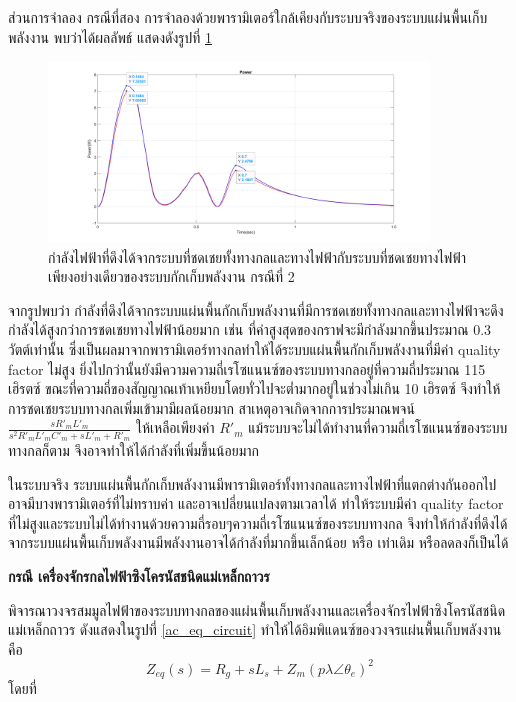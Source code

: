 \documentclass[11pt,a4paper]{article}
\begin{document}
ส่วนการจำลอง กรณีที่สอง การจำลองด้วยพารามิเตอร์ใกล้เคียงกับระบบจริงของระบบแผ่นพื้นเก็บพลังงาน พบว่าได้ผลลัพธ์ แสดงดังรูปที่ \ref{power_dc_case2}
\begin{figure}[H]
    \begin{center}
        \includegraphics[width=0.9\textwidth]{power_dc_case2.jpg}
    \end{center}
    \caption{กำลังไฟฟ้าที่ดึงได้จากระบบที่ชดเชยทั้งทางกลและทางไฟฟ้ากับระบบที่ชดเชยทางไฟฟ้าเพียงอย่างเดียวของระบบกักเก็บพลังงาน กรณีที่ 2}
    \label{power_dc_case2}
\end{figure}
จากรูปพบว่า กำลังที่ดึงได้จากระบบแผ่นพื้นกักเก็บพลังงานที่มีการชดเชยทั้งทางกลและทางไฟฟ้าจะดึงกำลังได้สูงกว่าการชดเชยทางไฟฟ้าน้อยมาก เช่น ที่ค่าสูงสุดของกราฟจะมีกำลังมากขึ้นประมาณ 0.3 วัตต์เท่านั้น 
ซึ่งเป็นผลมาจากพารามิเตอร์ทางกลทำให้ได้ระบบแผ่นพื้นกักเก็บพลังงานที่มีค่า quality factor ไม่สูง ยิ่งไปกว่านั้นยังมีความความถี่เรโซแนนซ์ของระบบทางกลอยู่ที่ความถี่ประมาณ 115 เฮิรตซ์ ขณะที่ความถี่ของสัญญาณเท้าเหยียบโดยทั่วไปจะต่ำมากอยู่ในช่วงไม่เกิน 10 เฮิรตซ์ 
จึงทำให้การชดเชยระบบทางกลเพิ่มเข้ามามีผลน้อยมาก สาเหตุอาจเกิดจากการประมาณพจน์ $\frac{ sR'_{m}L'_{m} }{ s^2R'_{m}L'_{m}C'_{m} + sL'_{m} + R'_{m} }$ ให้เหลือเพียงค่า $R'_{m}$ แม้ระบบจะไม่ได้ทำงานที่ความถี่เรโซแนนซ์ของระบบทางกลก็ตาม จึงอาจทำให้ได้กำลังที่เพิ่มขึ้นน้อยมาก

ในระบบจริง ระบบแผ่นพื้นกักเก็บพลังงานมีพารามิเตอร์ทั้งทางกลและทางไฟฟ้าที่แตกต่างกันออกไป อาจมีบางพารามิเตอร์ที่ไม่ทราบค่า และอาจเปลี่ยนแปลงตามเวลาได้ ทำให้ระบบมีค่า quality factor ที่ไม่สูงและระบบไม่ได้ทำงานด้วยความถี่รอบๆความถี่เรโซแนนซ์ของระบบทางกล จึงทำให้กำลังที่ดึงได้จากระบบแผ่นพื้นเก็บพลังงานมีพลังงานอาจได้กำลังที่มากขึ้นเล็กน้อย หรือ เท่าเดิม หรือลดลงก็เป็นได้ 

\textbf{กรณี เครื่องจักรกลไฟฟ้าซิงโครนัสชนิดแม่เหล็กถาวร}

พิจารณาวงจรสมมูลไฟฟ้าของระบบทางกลของแผ่นพื้นเก็บพลังงานและเครื่องจักรไฟฟ้าซิงโครนัสชนิดแม่เหล็กถาวร ดังแสดงในรูปที่ \ref{ac_eq_circuit} ทำให้ได้อิมพิแดนซ์ของวงจรแผ่นพื้นเก็บพลังงาน คือ
\begin{equation} \label{}
    Z_{eq}(s)=  R_{g} + sL_{s} + Z_{m}(p\lambda \angle \theta_{e})^2  
\end{equation}
โดยที่
\end{document}
